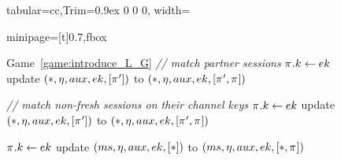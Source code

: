 \newcommand*{\codewidth}{0.7\linewidth}
\newcommand*{\codescale}{0.7}

\begin{figure}


\begin{leftfullpage}


\small

\setlength{\tabcolsep}{0.2pt}
\renewcommand{\arraystretch}{2}


\begin{adjustbox}{tabular={cc},Trim=0.9ex 0 0 0, width=\textwidth}
	\begin{adjustbox}{minipage=[t]{\codewidth},fbox}
		\begin{algorithmic}[1]	
			\Statex 
			\Comment Game~\ref{game:introduce_L_G}
			\color{hidecode}
			\State \textcolor{hidecode}{\emph{// match partner sessions}}
			\color{black}
			\color{hidecode}
			\label{alg:line:send_game_hops_match_fresh}
				\State $\oracle.\key \gets ek$
				\State update $(*, \nonce, aux, ek, [\oracle'])$ to $(*, \nonce, aux, ek, [\oracle', \oracle])$
		
		
			\State \textcolor{hidecode}{\emph{// match non-fresh sessions on their channel keys}}
				\State $\oracle.\key \gets ek$
				\State update $(*, \nonce, aux, ek, [\oracle'])$ to $(*, \nonce, aux, ek, [\oracle', \oracle])$	
			
			\EndIf 
			
			\color{black}
			
		
			\State {}
			\label{alg:line:send_game_hops_catch_all_check}
				\State $\oracle.\key \gets ek$
				\State update $(ms, \eta, aux, ek, [*])$ to $(ms, \nonce, aux, ek, [*,\oracle])$
				\label{alg:line:send_game_hops_catch_all_final_line}
			

\end{algorithmic}
\end{adjustbox}
\end{adjustbox}
\end{leftfullpage}
\end{figure}
